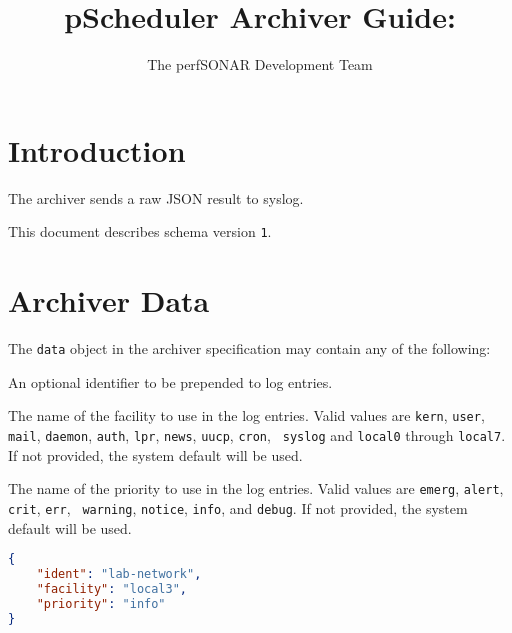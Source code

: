 \documentclass[10pt]{article}
\title{pScheduler Archiver Guide: {\it \archivername}}
\author{The perfSONAR Development Team}
\begin{document}
\maketitle


%
%

\section{Introduction}

The {\tt \archivername} archiver sends a raw JSON result to syslog.

This document describes schema version {\tt 1}.


%
%

\section{Archiver Data}

The {\tt data} object in the archiver specification may contain any of
the following:

 An optional identifier to be prepended to
log entries.

 The name of the facility to use in the log entries.
Valid values are {\tt kern}, {\tt user}, {\tt mail}, {\tt daemon},
{\tt auth}, {\tt lpr}, {\tt news}, {\tt uucp}, {\tt cron}, {\tt
syslog} and {\tt local0} through {\tt local7}.  If not provided, the
system default will be used.

 The name of the priority to use in the log entries.
Valid values are {\tt emerg}, {\tt alert}, {\tt crit}, {\tt err}, {\tt
warning}, {\tt notice}, {\tt info}, and {\tt debug}.  If not provided,
the system default will be used.

\example
\begin{lstlisting}[language=json]
{
    "ident": "lab-network",
    "facility": "local3",
    "priority": "info"
}
\end{lstlisting}
\end{document}
